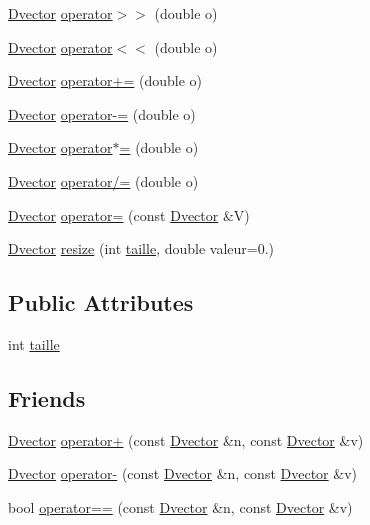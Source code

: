 \begin{DoxyCompactItemize}
\item 
\hyperlink{classDvector}{Dvector} \hyperlink{classDvector_ac9aed3cdd57a33e2a3fc6cc9da59bf10}{operator$>$$>$} (double o)
\item 
\hyperlink{classDvector}{Dvector} \hyperlink{classDvector_a0642720ca4ecae9d6fe8cf24cf9cffd6}{operator$<$$<$} (double o)
\item 
\hyperlink{classDvector}{Dvector} \hyperlink{classDvector_a47c89af4906459043b66b5aba4b9cef4}{operator+=} (double o)
\item 
\hyperlink{classDvector}{Dvector} \hyperlink{classDvector_a1b3d3ea283f2ebb3b0566220df97c1fd}{operator-\/=} (double o)
\item 
\hyperlink{classDvector}{Dvector} \hyperlink{classDvector_a8cb4e4ffcb838428b0e22e982edb132f}{operator$\ast$=} (double o)
\item 
\hyperlink{classDvector}{Dvector} \hyperlink{classDvector_a06ef842c794c08c19525dd1065f8e739}{operator/=} (double o)
\item 
\hyperlink{classDvector}{Dvector} \hyperlink{classDvector_abf0bed6290ef45d7811b69732ad4a8cf}{operator=} (const \hyperlink{classDvector}{Dvector} \&V)
\item 
\hyperlink{classDvector}{Dvector} \hyperlink{classDvector_a3242a315e31b62886285e5d92af43a6f}{resize} (int \hyperlink{classDvector_a728a936adcb2a17365255656c5f94692}{taille}, double valeur=0.)
\end{DoxyCompactItemize}
\subsection*{Public Attributes}
\begin{DoxyCompactItemize}
\item 
int \hyperlink{classDvector_a728a936adcb2a17365255656c5f94692}{taille}
\end{DoxyCompactItemize}
\subsection*{Friends}
\begin{DoxyCompactItemize}
\item 
\hyperlink{classDvector}{Dvector} \hyperlink{classDvector_adc04cf82aee079aca57cf20806737afe}{operator+} (const \hyperlink{classDvector}{Dvector} \&n, const \hyperlink{classDvector}{Dvector} \&v)
\item 
\hyperlink{classDvector}{Dvector} \hyperlink{classDvector_a73a2612ede73afd8f5e94fa2ae0d6aa4}{operator-\/} (const \hyperlink{classDvector}{Dvector} \&n, const \hyperlink{classDvector}{Dvector} \&v)
\item 
bool \hyperlink{classDvector_a78765ce7576547b645ccc54e0b22e7bf}{operator==} (const \hyperlink{classDvector}{Dvector} \&n, const \hyperlink{classDvector}{Dvector} \&v)
\end{DoxyCompactItemize}


